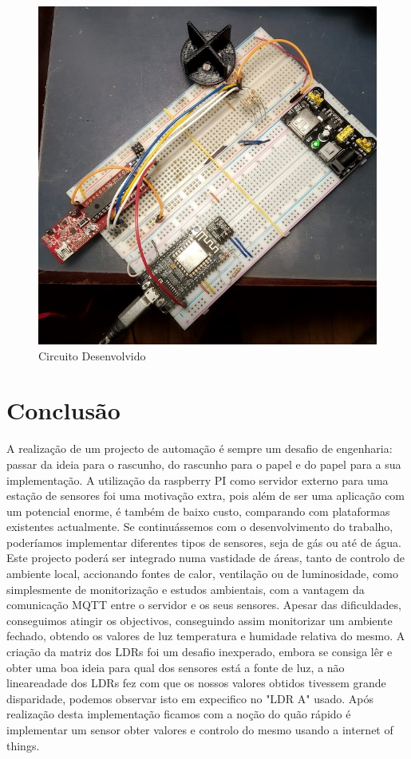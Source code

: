 \documentclass[12pt]{article}
\begin{document}
\begin{figure}[H]
  \centering
     \includegraphics[width=0.7\linewidth]{imgs/V04_Physical_Circuit.jpg}
    \caption{Circuito Desenvolvido}
  \label{fig:physical_circuit}
\end{figure}


\section{Conclusão}


A realização de um projecto de automação é sempre um desafio de engenharia: passar da ideia para o rascunho, do rascunho para o papel e do papel para a sua implementação. A utilização da raspberry PI como servidor externo para uma estação de sensores foi uma motivação extra, pois além de ser uma aplicação com um potencial enorme, é também de baixo custo, comparando com plataformas existentes actualmente. Se continuássemos com o desenvolvimento do trabalho, poderíamos implementar diferentes tipos de sensores, seja de gás ou até de água. Este projecto poderá ser integrado numa vastidade de áreas, tanto de controlo de ambiente local, accionando fontes de calor, ventilação ou de luminosidade, como simplesmente de monitorização e estudos ambientais, com a vantagem da comunicação MQTT entre o servidor e os seus sensores. 
Apesar das dificuldades, conseguimos atingir os objectivos, conseguindo assim monitorizar um ambiente fechado, obtendo os valores de luz temperatura e humidade relativa do mesmo.
A criação da matriz dos LDRs foi um desafio inexperado, embora se consiga lêr e obter uma boa ideia para qual dos sensores está a fonte de luz, a não lineareadade dos LDRs fez com que os nossos valores obtidos tivessem grande disparidade, podemos observar isto em expecifico no "LDR A" usado.
Após realização desta implementação ficamos com a noção do quão rápido é implementar um sensor obter valores e controlo do mesmo usando a internet of things.
\end{document}
